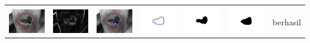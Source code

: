 \begin{table}[H]
\begin{tabular}{|m{0.7in}|m{0.7in}|m{0.7in}|m{0.7in}|m{0.7in}|m{0.7in}|m{0.7in}|}
		&  &  & & & &  \\
		\includegraphics[width=0.7in]{dataset/dataset_3/luka_merah/ready/17_interp_init.jpg}&
		\includegraphics[width=0.7in]{dataset/dataset_3/luka_merah/ready/17_interp_ext.jpg}&
		\includegraphics[width=0.7in]{dataset/dataset_3/luka_merah/ready/17_interp_result.jpg}&
		\includegraphics[width=0.7in]{dataset/dataset_3/luka_merah/ready/17_gt_r.jpg}&
		\includegraphics[width=0.7in]{dataset/dataset_3/luka_merah/ready/17_r.jpg}&
		\includegraphics[width=0.7in]{dataset/dataset_3/luka_merah/ready/17_interp_r.jpg}&
		berhasil\\
		\hline
		

\end{tabular}
\end{table}
